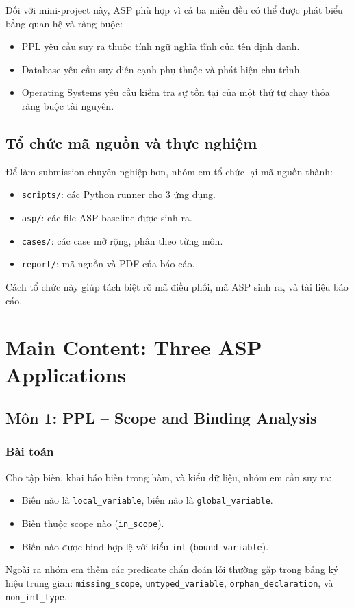 ﻿\documentclass[11pt,a4paper]{article}
\begin{document}
Đối với mini-project này, ASP phù hợp vì cả ba miền đều có thể được phát biểu bằng quan hệ và ràng buộc:
\begin{itemize}[leftmargin=1.5em]
  \item PPL yêu cầu suy ra thuộc tính ngữ nghĩa tĩnh của tên định danh.
  \item Database yêu cầu suy diễn cạnh phụ thuộc và phát hiện chu trình.
  \item Operating Systems yêu cầu kiểm tra sự tồn tại của một thứ tự chạy thỏa ràng buộc tài nguyên.
\end{itemize}

\subsection{Tổ chức mã nguồn và thực nghiệm}
Để làm submission chuyên nghiệp hơn, nhóm em tổ chức lại mã nguồn thành:
\begin{itemize}[leftmargin=1.5em]
  \item \texttt{scripts/}: các Python runner cho 3 ứng dụng.
  \item \texttt{asp/}: các file ASP baseline được sinh ra.
  \item \texttt{cases/}: các case mở rộng, phân theo từng môn.
  \item \texttt{report/}: mã nguồn và PDF của báo cáo.
\end{itemize}
Cách tổ chức này giúp tách biệt rõ mã điều phối, mã ASP sinh ra, và tài liệu báo cáo.

\section{Main Content: Three ASP Applications}
\subsection{Môn 1: PPL -- Scope and Binding Analysis}
\subsubsection*{Bài toán}
Cho tập biến, khai báo biến trong hàm, và kiểu dữ liệu, nhóm em cần suy ra:
\begin{itemize}[leftmargin=1.5em]
  \item Biến nào là \texttt{local\_variable}, biến nào là \texttt{global\_variable}.
  \item Biến thuộc scope nào (\texttt{in\_scope}).
  \item Biến nào được bind hợp lệ với kiểu \texttt{int} (\texttt{bound\_variable}).
\end{itemize}
Ngoài ra nhóm em thêm các predicate chẩn đoán lỗi thường gặp trong bảng ký hiệu trung gian: \texttt{missing\_scope}, \texttt{untyped\_variable}, \texttt{orphan\_declaration}, và \texttt{non\_int\_type}.
\end{document}
